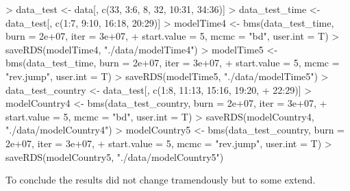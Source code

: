 \documentclass{article}
\begin{document}
\begin{Schunk}
\begin{Sinput}
> data_test <- data[, c(33, 3:6, 8, 32, 10:31, 34:36)]
> data_test_time <- data_test[, c(1:7, 9:10, 16:18, 20:29)]
> modelTime4 <- bms(data_test_time, burn = 2e+07, iter = 3e+07, 
+     start.value = 5, mcmc = "bd", user.int = T)
> saveRDS(modelTime4, "./data/modelTime4")
> modelTime5 <- bms(data_test_time, burn = 2e+07, iter = 3e+07, 
+     start.value = 5, mcmc = "rev.jump", user.int = T)
> saveRDS(modelTime5, "./data/modelTime5")
> data_test_country <- data_test[, c(1:8, 11:13, 15:16, 19:20, 
+     22:29)]
> modelCountry4 <- bms(data_test_country, burn = 2e+07, iter = 3e+07, 
+     start.value = 5, mcmc = "bd", user.int = T)
> saveRDS(modelCountry4, "./data/modelCountry4")
> modelCountry5 <- bms(data_test_country, burn = 2e+07, iter = 3e+07, 
+     start.value = 5, mcmc = "rev.jump", user.int = T)
> saveRDS(modelCountry5, "./data/modelCountry5")
\end{Sinput}
\end{Schunk}

To conclude the results did not change tramendously but to some extend. 
\end{document}
